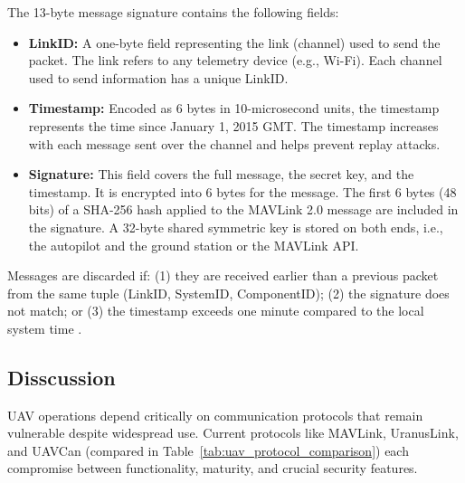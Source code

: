 The 13-byte message signature contains the following fields:
\begin{itemize}
    \item \textbf{LinkID:} A one-byte field representing the link (channel) used to send the packet. The link refers to any telemetry device (e.g., Wi-Fi). Each channel used to send information has a unique LinkID.
    \item \textbf{Timestamp:} Encoded as 6 bytes in 10-microsecond units, the timestamp represents the time since January 1, 2015 GMT. The timestamp increases with each message sent over the channel and helps prevent replay attacks.
    \item \textbf{Signature:} This field covers the full message, the secret key, and the timestamp. It is encrypted into 6 bytes for the message. The first 6 bytes (48 bits) of a SHA-256 hash applied to the MAVLink 2.0 message are included in the signature. A 32-byte shared symmetric key is stored on both ends, i.e., the autopilot and the ground station or the MAVLink API.
\end{itemize}

Messages are discarded if: (1) they are received earlier than a previous packet from the same tuple (LinkID, SystemID, ComponentID); (2) the signature does not match; or (3) the timestamp exceeds one minute compared to the local system time \cite{koubaa2017mavlink}.




\subsection{ Disscussion}


UAV operations depend critically on communication protocols that remain vulnerable despite widespread use. Current protocols like MAVLink, UranusLink, and UAVCan (compared in Table~\ref{tab:uav_protocol_comparison}) each compromise between functionality, maturity, and crucial security features.




